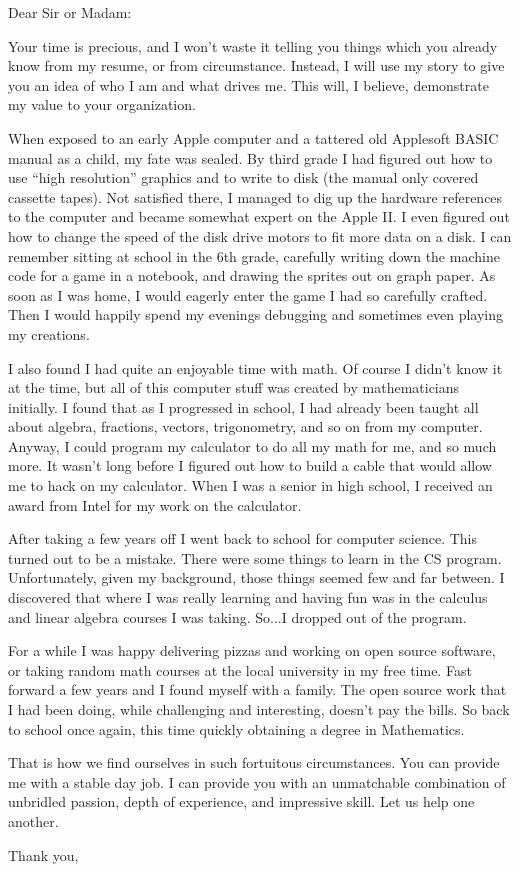 \documentclass{letter}
\begin{document}
\begin{letter}{}
\opening{Dear Sir or Madam:}

Your time is precious, and I won't waste it telling you things which you already know from my resume, or from circumstance. Instead, I will use my story to give you an idea of who I am and what drives me. This will, I believe, demonstrate my value to your organization.

When exposed to an early Apple computer and a tattered old Applesoft BASIC manual as a child, my fate was sealed. By third grade I had figured out how to use ``high resolution'' graphics and to write to disk (the manual only covered cassette tapes). Not satisfied there, I managed to dig up the hardware references to the computer and became somewhat expert on the Apple II. I even figured out how to change the speed of the disk drive motors to fit more data on a disk. I can remember sitting at school in the 6th grade, carefully writing down the machine code for a game in a notebook, and drawing the sprites out on graph paper. As soon as I was home, I would eagerly enter the game I had so carefully crafted. Then I would happily spend my evenings debugging and sometimes even playing my creations.

I also found I had quite an enjoyable time with math. Of course I didn't know it at the time, but all of this computer stuff was created by mathematicians initially. I found that as I progressed in school, I had already been taught all about algebra, fractions, vectors, trigonometry, and so on from my computer. Anyway, I could program my calculator to do all my math for me, and so much more. It wasn't long before I figured out how to build a cable that would allow me to hack on my calculator. When I was a senior in high school, I received an award from Intel for my work on the calculator.

After taking a few years off I went back to school for computer science. This turned out to be a mistake. There were some things to learn in the CS program. Unfortunately, given my background, those things seemed few and far between. I discovered that where I was really learning and having fun was in the calculus and linear algebra courses I was taking. So...I dropped out of the program.

For a while I was happy delivering pizzas and working on open source software, or taking random math courses at the local university in my free time. Fast forward a few years and I found myself with a family. The open source work that I had been doing, while challenging and interesting, doesn't pay the bills. So back to school once again, this time quickly obtaining a degree in Mathematics.

That is how we find ourselves in such fortuitous circumstances. You can provide me with a stable day job. I can provide you with an unmatchable combination of unbridled passion, depth of experience, and impressive skill. Let us help one another.


\closing{Thank you,}
\end{letter}
\end{document}
